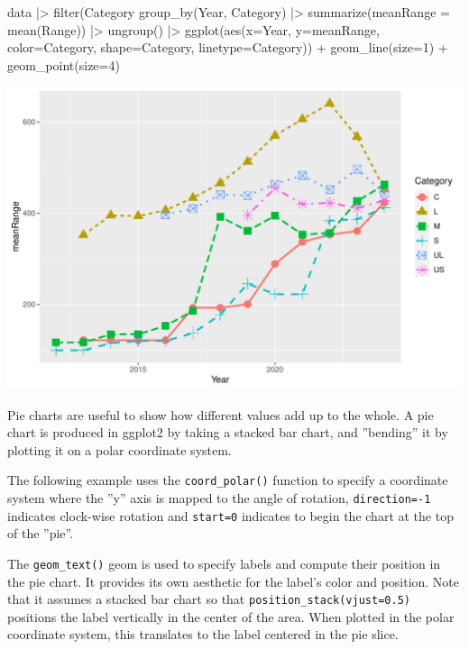 \begin{Rcode}
data |> 
  filter(Category %
  group_by(Year, Category) |>
  summarize(meanRange = mean(Range)) |>
  ungroup() |>
  ggplot(aes(x=Year, y=meanRange, 
             color=Category, 
             shape=Category, 
             linetype=Category)) +
    geom_line(size=1) + 
    geom_point(size=4)  
\end{Rcode}

\begin{center}
  \includegraphics[width=.8\textwidth]{fuel.linesPoints.pdf}
\end{center}




Pie charts are useful to show how different values add up to the whole. A pie chart is produced in ggplot2 by taking a stacked bar chart, and ''bending'' it by plotting it on a polar coordinate system. 

The following example uses the \texttt{coord\_polar()} function to specify a coordinate system where the ''y'' axis is mapped to the angle of rotation, \texttt{direction=-1} indicates clock-wise rotation and \texttt{start=0} indicates to begin the chart at the top of the ''pie''. 

The \texttt{geom\_text()} geom is used to specify labels and compute their position in the pie chart. It provides its own aesthetic for the label's color and position. Note that it assumes a stacked bar chart so that \texttt{position\_stack(vjust=0.5)} positions the label vertically in the center of the area. When plotted in the polar coordinate system, this translates to the label centered in the pie slice. 

